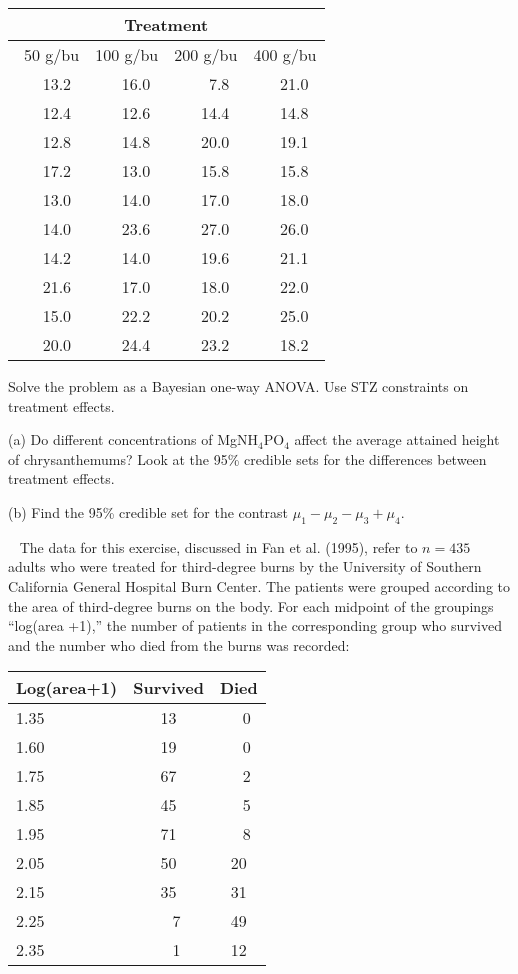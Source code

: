 \documentclass[12pt]{article}
\begin{document}
\begin{center}
\begin{tabular}{|r|r|r|r|}
\hline
\multicolumn{4}{|c|}{Treatment} \\
\hline
~50 g/bu & 100 g/bu & 200 g/bu & 400 g/bu\\
\hline
13.2~ & 16.0~ &  7.8~ & 21.0~ \\
12.4~ & 12.6~ & 14.4~ & 14.8~ \\
12.8~ & 14.8~ & 20.0~ & 19.1~ \\
17.2~ & 13.0~ & 15.8~ & 15.8~ \\
13.0~ & 14.0~ & 17.0~ & 18.0~ \\
14.0~ & 23.6~ & 27.0~ & 26.0~ \\
14.2~ & 14.0~ & 19.6~ & 21.1~ \\
21.6~ & 17.0~ & 18.0~ & 22.0~ \\
15.0~ & 22.2~ & 20.2~ & 25.0~ \\
20.0~ & 24.4~ & 23.2~ & 18.2~ \\
\hline
\end{tabular}
\end{center}

Solve the problem as a Bayesian one-way ANOVA. Use STZ constraints
on treatment effects.

(a) Do different concentrations
of MgNH$_4$PO$_4$ affect the average attained height of chrysanthemums? Look at the 95\% credible sets for the differences between treatment effects.

(b) Find the 95\% credible set for the contrast $\mu_1 - \mu_2 - \mu_3 + \mu_4.$




  \vspace*{0.3in}
~ %
%
The data for this exercise, discussed in Fan et al. (1995), refer to $n=435$ adults who were treated for third-degree burns by the University of Southern California General Hospital Burn Center. The patients were grouped according to the area of third-degree burns on the body. For each midpoint of the groupings ``log(area +1),'' the number of patients in the corresponding group who survived and the number who died from the burns was recorded:


\begin{center}
\begin{tabular}{lcc}
\hline
Log(area+1) & Survived & Died \\
\hline
1.35 & 13 & ~~0\\
1.60 & 19 & ~~0\\
1.75 & 67 & ~~2 \\
1.85 & 45 & ~~5 \\
1.95 & 71 & ~~8 \\
2.05 & 50 & 20\\
2.15 & 35 & 31 \\
2.25 & ~~7 & 49 \\
2.35 & ~~1 & 12\\
\hline
\end{tabular}
\end{center}
\end{document}
